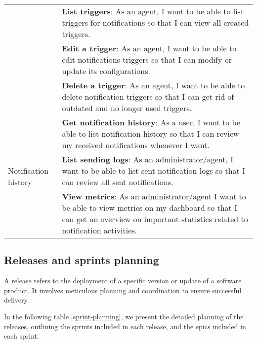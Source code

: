 \begin{longtable}{ | m{}  | m{} | }
      \cline{2-2}
                                                              & \textbf{List triggers}: As an agent, I want to be able to list triggers for notifications so that I can view all created triggers.                                                           \\
      \cline{2-2}
                                                              & \textbf{Edit a trigger}: As an agent, I want to be able to edit notifications triggers so that I can modify or update its configurations.                                                    \\
      \cline{2-2}
                                                              & \textbf{Delete a trigger}: As an agent, I want to be able to delete notification triggers so that I can get rid of outdated and no longer used triggers.                                     \\
      \hline
      \multirow[t]{4}{5em}{Notification history}              & \textbf{Get notification history}: As a user, I want to be able to list notification history so that I can review my received notifications whenever I want.                                 \\
      \cline{2-2}
                                                              & \textbf{List sending logs}: As an administrator/agent, I want to be able to list sent notification logs so that I can review all sent notifications.                                         \\
      \hline
      Dashboard                                               & \textbf{View metrics}: As an administrator/agent I want to be able to view metrics on my dashboard so that I can get an overview on important statistics related to notification activities. \\
      \hline
\end{longtable}

\subsection{Releases and sprints planning}
A release refers to the deployment of a specific version or update of a software product. It involves meticulous planning
and coordination to ensure successful delivery.

In the following table \ref{sprint-planning}, we present the detailed planning of the releases, outlining the sprints included in each release,
and the epics included in each sprint.

